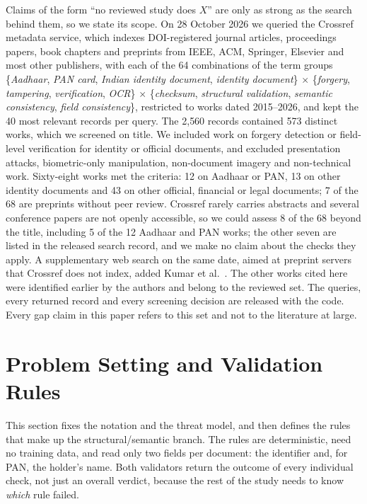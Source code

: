 \documentclass[conference]{IEEEtran}
\begin{document}
Claims of the form ``no reviewed study does $X$'' are only as strong as
the search behind them, so we state its scope. On 28 October 2026 we
queried the Crossref metadata service, which indexes DOI-registered
journal articles, proceedings papers, book chapters and preprints from
IEEE, ACM, Springer, Elsevier and most other publishers, with each of
the 64 combinations of the term groups \{\emph{Aadhaar}, \emph{PAN
card}, \emph{Indian identity document}, \emph{identity document}\}
$\times$ \{\emph{forgery}, \emph{tampering}, \emph{verification},
\emph{OCR}\} $\times$ \{\emph{checksum}, \emph{structural validation},
\emph{semantic consistency}, \emph{field consistency}\}, restricted to
works dated 2015--2026, and kept the 40 most relevant records per
query. The 2{,}560 records contained 573 distinct works, which we
screened on title. We included work on forgery detection or field-level
verification for identity or official documents, and excluded
presentation attacks, biometric-only manipulation, non-document imagery
and non-technical work. Sixty-eight works met the criteria: 12 on
Aadhaar or PAN, 13 on other identity documents and 43 on other official,
financial or legal documents; 7 of the 68 are preprints without peer
review. Crossref rarely carries abstracts and several conference papers
are not openly accessible, so we could assess 8 of the 68 beyond the
title, including 5 of the 12 Aadhaar and PAN works; the other seven are
listed in the released search record, and we make no claim about the
checks they apply. A supplementary web search on the same date, aimed at
preprint servers that Crossref does not index, added
Kumar et al.~\cite{flid}. The other works cited here were identified
earlier by the authors and belong to the reviewed set. The queries,
every returned record and every screening decision are released with
the code. Every gap claim in this paper refers to this set and not to
the literature at large.

\section{Problem Setting and Validation Rules}
\label{sec:framework}

This section fixes the notation and the threat model, and then defines
the rules that make up the structural/semantic branch. The rules are
deterministic, need no training data, and read only two fields per
document: the identifier and, for PAN, the holder's name. Both
validators return the outcome of every individual check, not just an
overall verdict, because the rest of the study needs to know
\emph{which} rule failed.
\end{document}
